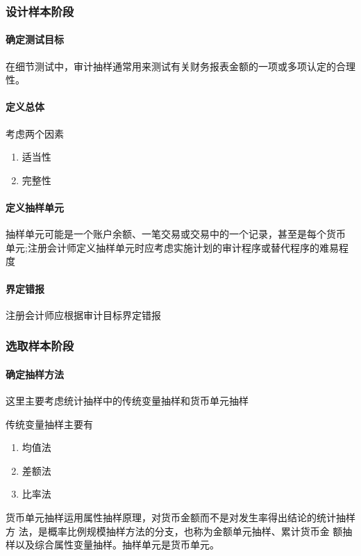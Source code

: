\documentclass[UTF8,12pt]{ctexart}
\numberwithin{equation}{section} %
\numberwithin{figure}{section}
\numberwithin{table}{section}
\begin{document}
	\subsubsection{设计样本阶段}
	\paragraph{确定测试目标} 在细节测试中，审计抽样通常用来测试有关财务报表金额的一项或多项认定的合理性。
	
	\paragraph{定义总体} 考虑两个因素
	\begin{enumerate}
		\item 适当性
		
		\item 完整性
	\end{enumerate}
	
	\paragraph{定义抽样单元}
	抽样单元可能是一个账户余额、一笔交易或交易中的一个记录，甚至是每个货币 单元;注册会计师定义抽样单元时应考虑实施计划的审计程序或替代程序的难易程度
	
	\paragraph{界定错报}
	注册会计师应根据审计目标界定错报
	
	\subsubsection{选取样本阶段}
	\paragraph{确定抽样方法}
	这里主要考虑统计抽样中的传统变量抽样和货币单元抽样
	
	传统变量抽样主要有
	\begin{enumerate}
		\item 均值法
		
		\item 差额法
		
		\item 比率法
	\end{enumerate}
	
	货币单元抽样运用属性抽样原理，对货币金额而不是对发生率得出结论的统计抽样方 法，是概率比例规模抽样方法的分支，也称为金额单元抽样、累计货币金 额抽样以及综合属性变量抽样。抽样单元是货币单元。
	
\end{document}
